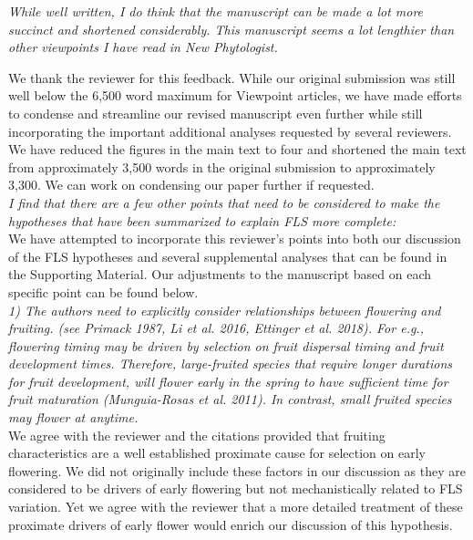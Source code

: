 \documentclass{article}[11pt]
\begin{document}
\emph{While well written, I do think that the manuscript can be made a lot more succinct and shortened considerably. This manuscript seems a lot lengthier than other viewpoints I have read in New Phytologist.}

\noindent We thank the reviewer for this feedback. While our original submission was still well below the 6,500 word maximum for Viewpoint articles, we have made efforts to condense and streamline our revised manuscript even further while still incorporating the important additional analyses requested by several reviewers. We have reduced the figures in the main text to four and shortened the main text from approximately 3,500 words in the original submission to approximately 3,300. We can work on condensing our paper further if requested.\\

\emph{I find that there are a few other points that need to be considered to make the hypotheses that have been summarized to explain FLS more complete:}\\

\noindent We have attempted to incorporate this reviewer's points into both our discussion of the FLS hypotheses and several supplemental analyses that can be found in the Supporting Material. Our adjustments to the manuscript based on each specific point can be found below.\\

\emph{1) The authors need to explicitly consider relationships between flowering and fruiting. (see Primack 1987, Li et al. 2016, Ettinger et al. 2018). For e.g., flowering timing may be driven by selection on fruit dispersal timing and fruit development times. Therefore, large-fruited species that require longer durations for fruit development, will flower early in the spring to have sufficient time for fruit maturation (Munguia-Rosas et al. 2011). In contrast, small fruited species may flower at anytime.}\\

\noindent We agree with the reviewer and the citations provided that fruiting characteristics are a well established proximate cause for selection on early flowering. We did not originally include these factors in our discussion as they are considered to be drivers of early flowering but not mechanistically related to FLS variation. Yet we agree with the reviewer that a more detailed treatment of these proximate drivers of early flower would enrich our discussion of this hypothesis. \\
\end{document}
